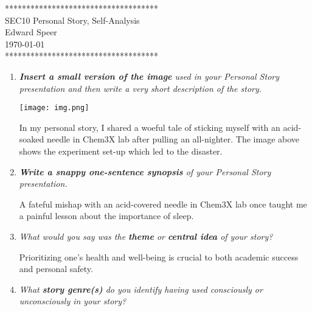 \documentclass{article}
\newcommand{\ans}[1]{\color{blue} #1 \color{black}}
\begin{document}

    \begin{center}
        ************************************ \\
        SEC10 Personal Story, Self-Analysis \\
        Edward Speer \\
        \today \\
        ************************************
    \end{center}

    \begin{enumerate}
    
        \item \emph{\textbf{Insert a small version of the image} used in your
              Personal Story presentation and then write a very short
              description of the story.}

            \begin{center}
                \texttt{[image: img.png]}
            \end{center}

            \ans{
                In my personal story, I shared a woeful tale of sticking myself
                with an acid-soaked needle in Chem3X lab after pulling an
                all-nighter. The image above shows the experiment set-up which
                led to the disaster.}\hfill \\

        \item \emph{\textbf{Write a snappy one-sentence synopsis} of your
              Personal Story presentation.}

            \ans{A fateful mishap with an acid-covered needle in Chem3X lab once
                taught me a painful lesson about the importance of sleep.}
                \hfill \\

        \item \emph{What would you say was the \textbf{theme} or
            \textbf{central idea} of your story?}

            \ans{Prioritizing one's health and well-being is crucial to both
                academic success and personal safety.} \hfill \\

        \item \emph{What \textbf{story genre(s)} do you identify having used
              consciously or unconsciously in your story?}
        

\end{enumerate}
\end{document}
